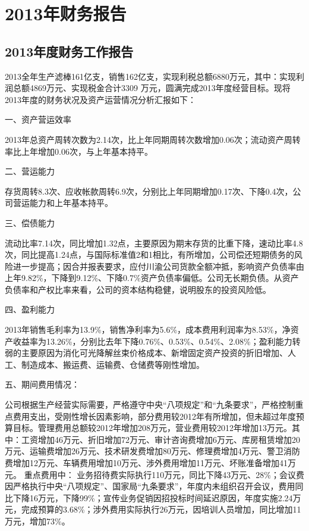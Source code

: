 ﻿\chapter{2013年财务报告}
\section{2013年度财务工作报告}

\indent
2013全年生产滤棒161亿支，销售162亿支，实现利税总额6880万元，其中：实现利润总额4869万元、实现税金合计3309 万元，圆满完成2013年度经营目标。现将2013年度的财务状况及资产运营情况分析汇报如下：

一、资产营运效率

2013年总资产周转次数为2.14次，比上年同期周转次数增加0.06次；流动资产周转率比上年增加0.06次，与上年基本持平。

二、营运能力

存货周转8.3次、应收帐款周转6.9次，分别比上年同期增加0.17次、下降0.4次，公司营运能力和上年基本持平。


三、偿债能力

流动比率7.14次，同比增加1.32点，主要原因为期末存货的比重下降，速动比率4.8次，同比提高1.24点，与国际标准值2和1相比，有所增加，公司偿还短期债务的风险进一步提高；因合并报表要求，应付川渝公司货款全额冲抵，影响资产负债率由上年9.82\%，下降到9.12\%、下降0.7\%资产负债率偏低。公司无长期负债。从资产负债率和产权比率来看，公司的资本结构稳健，说明股东的投资风险低。


四、盈利能力

    2013年销售毛利率为13.9\%，销售净利率为5.6\%，成本费用利润率为8.53\%，净资产收益率为13.26\%，分别比去年下降0.76\%、0.53\%、0.54\%、2.08\%；盈利能力转弱的主要原因为消化可光降解丝束价格成本、新增固定资产投资的折旧增加、人工、制造成本、搬运费、运输费、仓储费等刚性增加。


五、期间费用情况：

公司根据生产经营实际需要，严格遵守中央“八项规定”和“九条要求”，严格控制重点费用支出，受刚性增长因素影响，部分费用较2012年有所增加，但未超过年度预算目标。管理费用总额较2012年增加208万元，营业费用较2012年增加13万元。其中：工资增加46万元、折旧增加72万元、审计咨询费增加6万元、库房租赁增加20万元、运输费增加26万元、技术研发费增加80万元、修理费增加4万元、警卫消防费增加12万元、车辆费用增加10万元、涉外费用增加11万元、坏账准备增加41万元。
重点费用中：
业务招待费实际执行110万元，同比下降43万元、28\%；会议费因严格执行中央“八项规定”、国家局“九条要求”，年度内未组织召开会议，费用同比下降16万元，下降99\%；宣传业务促销因招投标时间延迟原因，年度实施2.24万元，完成预算的3.68\%；涉外费用实际执行26万元，因培训人员增加，同比增加11万元，增加73\%。

